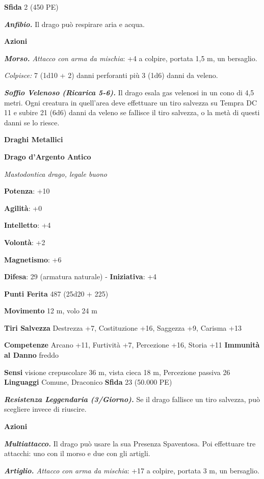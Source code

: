 \begin{multicols}{2}
\textbf{Sfida} 2 (450 PE)

\emph{\textbf{Anfibio.}} Il drago può respirare aria e acqua.

\textbf{Azioni}

\emph{\textbf{Morso.} Attacco con arma da mischia}: +4 a colpire,
portata 1,5 m, un bersaglio.

\emph{Colpisce:} 7 (1d10 + 2) danni perforanti più 3 (1d6) danni da
veleno.

\emph{\textbf{Soffio Velenoso (Ricarica 5-6).}} Il drago esala gas
velenosi in un cono di 4,5 metri. Ogni creatura in quell'area deve
effettuare un tiro salvezza su Tempra DC 11 e subire 21 (6d6)
danni da veleno se fallisce il tiro salvezza, o la metà di questi danni
se lo riesce.

\textbf{Draghi Metallici}

\textbf{Drago d'Argento Antico}

\emph{Mastodontica drago, legale buono}

\textbf{Potenza}: +10

\textbf{Agilità}: +0

\textbf{Intelletto}: +4

\textbf{Volontà}: +2

\textbf{Magnetismo}: +6

\textbf{Difesa}: 29 (armatura naturale) - \textbf{Iniziativa}: +4

\textbf{Punti Ferita} 487 (25d20 + 225) 

\textbf{Movimento} 12 m, volo 24 m

\textbf{Tiri Salvezza} Destrezza +7, Costituzione +16, Saggezza +9,
Carisma +13

\textbf{Competenze} Arcano +11, Furtività +7, Percezione +16, Storia +11
\textbf{Immunità al Danno} freddo

\textbf{Sensi} visione crepuscolare 36 m, vista cieca 18 m, Percezione passiva
26 \textbf{Linguaggi} Comune, Draconico \textbf{Sfida} 23 (50.000 PE)

\emph{\textbf{Resistenza Leggendaria (3/Giorno).}} Se il drago fallisce
un tiro salvezza, può scegliere invece di riuscire.

\textbf{Azioni}

\emph{\textbf{Multiattacco.}} Il drago può usare la sua Presenza
Spaventosa. Poi effettuare tre attacchi: uno con il morso e due con gli
artigli.

\emph{\textbf{Artiglio.} Attacco con arma da mischia}: +17 a colpire,
portata 3 m, un bersaglio.


\end{multicols}
